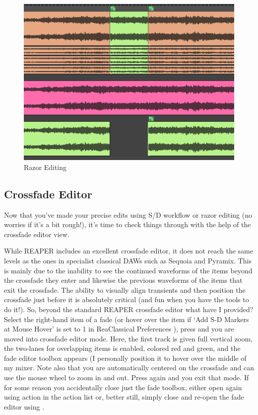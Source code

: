 \documentclass[10pt,american]{article}
\begin{document}
\begin{figure}
\includegraphics[width=1\linewidth]{user_guide_images/razor}

\caption{Razor Editing}

\end{figure}


\subsection{Crossfade Editor}

Now that you've made your precise edits using S/D workflow or razor editing (no
worries if it's a bit rough!), it's time to check things through with the help
of the crossfade editor view.

While REAPER includes an excellent crossfade editor, it does not reach the same
levels as the ones in specialist classical DAWs such as Sequoia and Pyramix.
This is mainly due to the inability to see the continued waveforms of the items
beyond the crossfade they enter and likewise the previous waveforms of the items
that exit the crossfade. The ability to visually align transients and then
position the crossfade just before it is absolutely critical (and fun when you
have the tools to do it!). So, beyond the standard REAPER crossfade editor what
have I provided? Select the right-hand item of a fade (or hover over the item if
`Add S-D Markers at Mouse Hover' is set to 1 in ReaClassical Preferences
), press  and you are moved into crossfade editor mode. Here,
the first track is given full vertical zoom, the two-lanes for overlapping items
is enabled, colored red and green, and the fade editor toolbox appears (I
personally position it to hover over the middle of my mixer. Note also that you
are automatically centered on the crossfade and can use the mouse wheel to zoom
in and out. Press  again and you exit that mode. If for some reason you
accidentally close just the fade toolbox, either open again using action in the
action list or, better still, simply close and re-open the fade editor using
 .
\end{document}
